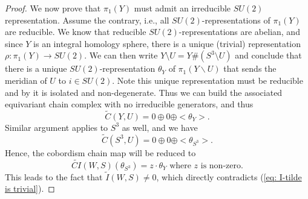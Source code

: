 \documentclass[11pt]{amsart}
\newcommand{\C}{\mathbb{C}}
\begin{document}
\begin{proof}
We now prove that $\pi_1(Y)$ must admit an irreducible $SU(2)$ representation. Assume the contrary, i.e., all $SU(2)$-representations of $\pi_1(Y)$ are reducible. We know that reducible $SU(2)$-representations are abelian, and since $Y$ is an integral homology sphere, there is a unique (trivial) representation $\rho: \pi_1(Y)\to SU(2)$. We can then write $Y \setminus U = Y \# (S^3 \setminus U)$ and conclude that there is a unique $SU(2)$-representation $\theta_Y$ of $\pi_1(Y\backslash U)$ that sends the meridian of $U$ to $i\in SU(2)$. Note this unique representation must be reducible and by \cite[Proposition 2.3]{DS-singular} it is isolated and non-degenerate. Thus we can build the associated equivariant chain complex with no irreducible generators, and thus
\[
\widetilde{C}(Y,U) = 0\oplus 0\oplus <\theta_Y>.
\]
Similar argument applies to $S^3$ as well, and we have
\[
\widetilde{C}(S^3,U) = 0\oplus 0\oplus <\theta_{S^3}>.
\]
Hence, the cobordism chain map will be reduced to 
\[
\widetilde{CI}(W,S) (\theta_{S^3}) = z\cdot \theta_Y\text{ where }z\text{ is non-zero}.
\]
This leads to the fact that $\tilde{I}(W,S)\neq 0$, which directly contradicts (\ref{eq: I-tilde is trivial}).




\end{proof}
\end{document}
